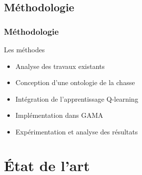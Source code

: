 \documentclass[11pt]{beamer}
\begin{document}
\subsection{Méthodologie}
\begin{frame}
\frametitle{Méthodologie}
\begin{block}{Les méthodes}
    \begin{itemize}
    \item Analyse des travaux existants

    \item Conception d’une ontologie de la chasse

    \item Intégration de l’apprentissage Q-learning

    \item Implémentation dans GAMA

    \item Expérimentation et analyse des résultats 
   
    \end{itemize}
\end{block}
\end{frame}

\section{État de l'art}
\end{document}

